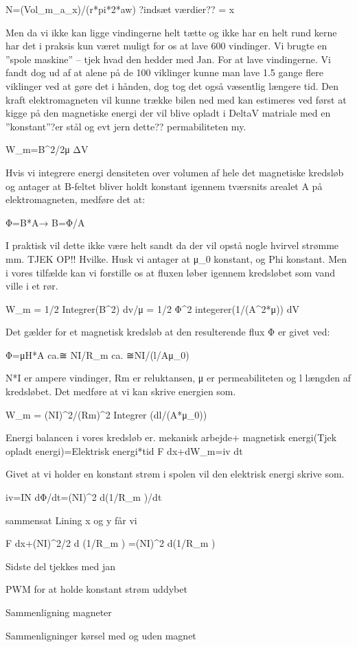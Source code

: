 N=(Vol_m_a_x)/(r*pi*2*aw)  ?indsæt værdier?? = x

Men da vi ikke kan ligge vindingerne helt tætte og ikke har en helt rund kerne har det i praksis kun været muligt for os at lave 600 vindinger.
Vi brugte en ”spole maskine” – tjek hvad den hedder med Jan. For at lave vindingerne. Vi fandt dog ud af at alene på de 100 viklinger kunne man lave 1.5 gange flere viklinger ved at gøre det i hånden, dog tog det også væsentlig længere tid.
Den kraft elektromagneten vil kunne trække bilen ned med kan estimeres ved først at kigge på den magnetiske energi der vil blive opladt i DeltaV matriale med  en ”konstant”?er stål  og evt jern dette?? permabiliteten my. 

W_m=B^2/2μ ΔV

Hvis vi integrere energi densiteten over volumen af hele det magnetiske kredsløb og antager at B-feltet bliver holdt konstant igennem tværsnits arealet A på elektromagneten, medføre det at:

Φ=B*A→
B=Φ/A

I praktisk vil dette ikke være helt sandt da der vil opstå nogle hvirvel strømme mm. TJEK OP!! Hvilke. Husk vi antager at μ_0 konstant, og Phi konstant.  Men i vores tilfælde kan vi forstille os at fluxen løber igennem kredsløbet som vand ville i et rør.

W_m = 1/2 Integrer(B^2) dv/μ = 1/2 Φ^2 integerer(1/(A^2*μ)) dV

Det gælder for et magnetisk kredsløb at den resulterende flux Φ er givet ved:

Φ=μH*A  ca.≅ NI/R_m ca. ≅NI/(l/Aμ_0)

N*I er ampere vindinger, Rm er reluktansen, μ er permeabiliteten og l længden af kredsløbet. Det medføre at vi kan skrive energien som.

W_m = (NI)^2/(Rm)^2 Integrer (dl/(A*μ_0))

Energi balancen i vores kredsløb er.
mekanisk arbejde+ magnetisk energi(Tjek opladt energi)=Elektrisk energi*tid
F dx+dW_m=iv dt

Givet at vi holder en konstant strøm i spolen vil den elektrisk energi skrive som.

iv=IN dΦ/dt=(NI)^2  d(1/R_m )/dt  

sammensat Lining x og y får vi

F dx+(NI)^2/2  d (1/R_m )  =(NI)^2  d(1/R_m )

Sidste del tjekkes med jan

PWM for at holde konstant strøm uddybet 

Sammenligning magneter

Sammenligninger kørsel med og uden magnet